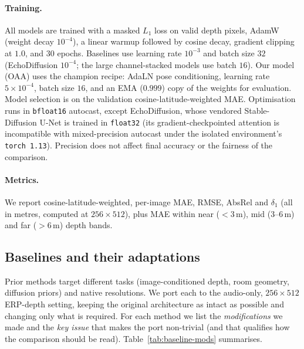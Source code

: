 \paragraph{Training.}
All models are trained with a masked $L_1$ loss on valid depth pixels, AdamW
(weight decay $10^{-4}$), a linear warmup followed by cosine decay, gradient
clipping at $1.0$, and $30$ epochs. Baselines use learning rate $10^{-3}$ and batch
size $32$ (EchoDiffusion $10^{-4}$; the large channel-stacked models use batch
$16$). Our model (OAA) uses the champion recipe: AdaLN pose conditioning, learning
rate $5\times10^{-4}$, batch size $16$, and an EMA ($0.999$) copy of the weights for
evaluation. Model selection is on the validation cosine-latitude-weighted MAE.
Optimisation runs in \texttt{bfloat16} autocast, except EchoDiffusion, whose
vendored Stable-Diffusion U-Net is trained in \texttt{float32} (its
gradient-checkpointed attention is incompatible with mixed-precision autocast under
the isolated environment's \texttt{torch~1.13}). Precision does not affect final
accuracy or the fairness of the comparison.

\paragraph{Metrics.}
We report cosine-latitude-weighted, per-image MAE, RMSE, AbsRel and $\delta_1$
(all in metres, computed at $256\times512$), plus MAE within near ($<3$\,m), mid
($3$--$6$\,m) and far ($>6$\,m) depth bands.

\subsection{Baselines and their adaptations}
\label{sec:baselines}
Prior methods target different tasks (image-conditioned depth, room geometry,
diffusion priors) and native resolutions. We port each to the audio-only,
$256\times512$ ERP-depth setting, keeping the original architecture as intact as
possible and changing only what is required. For each method we list the
\emph{modifications} we made and the \emph{key issue} that makes the port
non-trivial (and that qualifies how the comparison should be read).
Table~\ref{tab:baseline-mods} summarises.

